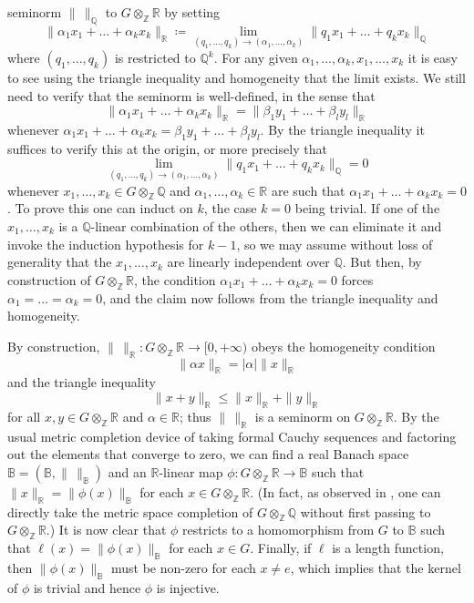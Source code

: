 \documentclass[11pt,a4paper,reqno]{amsart}
\numberwithin{equation}{section}
\theoremstyle{plain}
\theoremstyle{definition}
\newcommand\R{\mathbb{R}}
\newcommand\Z{\mathbb{Z}}
\newcommand\Q{\mathbb{Q}}
\newcommand\normsymb{\ell}  %
\newcommand\norm[1]{\ell({#1})}   %
\begin{document}
seminorm $\|\,\|_\Q$ to $G \otimes_\Z \R$ by setting
\[
\|\alpha_1 x_1 + \dots + \alpha_k x_k\|_\R \coloneqq
\lim_{(q_1,\dots,q_k) \to (\alpha_1,\dots,\alpha_k)} \| q_1 x_1 + \dots +
q_k x_k\|_\Q
\]
where $(q_1,\dots,q_k)$ is restricted to $\Q^k$.  For any given
$\alpha_1,\dots,\alpha_k,x_1,\dots,x_k$ it is easy to see using the
triangle inequality and homogeneity that the limit exists.  We still need
to verify that the seminorm is well-defined, in the sense that
\[
\|\alpha_1 x_1 + \dots + \alpha_k x_k\|_\R  = \| \beta_1 y_1 + \dots +
\beta_l y_l \|_\R
\]
whenever $\alpha_1 x_1 + \dots + \alpha_k x_k = \beta_1 y_1 + \dots +
\beta_l y_l$.  By the triangle inequality it suffices to verify this at
the origin, or more precisely that
\[
\lim_{(q_1,\dots,q_k) \to (\alpha_1,\dots,\alpha_k)} \| q_1 x_1 + \dots +
q_k x_k\|_\Q = 0
\]
whenever $x_1,\dots,x_k \in G \otimes_\Z \Q$ and $\alpha_1,\dots,\alpha_k
\in \R$ are such that $\alpha_1 x_1 + \dots + \alpha_k x_k = 0$.  To
prove this one can induct on $k$, the case $k=0$ being trivial.  If one
of the $x_1,\dots,x_k$ is a $\Q$-linear combination of the others, then
we can eliminate it and invoke the induction hypothesis for $k-1$, so we
may assume without loss of generality that the $x_1,\dots,x_k$ are
linearly independent over $\Q$.  But then, by construction of $G
\otimes_\Z \R$, the condition $\alpha_1 x_1 + \dots + \alpha_k x_k = 0$
forces $\alpha_1=\dots=\alpha_k=0$, and the claim now follows from the
triangle inequality and homogeneity.

By construction, $\| \, \|_\R: G \otimes_\Z \R \to
[0,+\infty)$ obeys the homogeneity condition
\[
\| \alpha x \|_\R = |\alpha| \|x\|_\R
\]
and the triangle inequality
\[
\|x+y\|_\R \leq \|x\|_\R + \|y\|_\R
\]
for all $x,y \in G \otimes_\Z \R$ and $\alpha \in \R$; thus $\|\,\|_\R$
is a seminorm on $G \otimes_\Z \R$.   By the usual metric completion
device of taking formal Cauchy sequences and factoring out the elements
that converge to zero, we can find a real Banach space $\mathbb{B} =
(\mathbb{B},\|\,\|_{\mathbb{B}})$ and an $\R$-linear map $\phi: G
\otimes_\Z \R \to \mathbb{B}$ such that $\|x\|_\R = \| \phi(x)
\|_{\mathbb{B}}$ for each $x \in G \otimes_\Z \R$.
(In fact, as observed in \cite{KR2}, one can directly take the metric
space completion of $G \otimes_\Z \Q$ without first passing to $G
\otimes_\Z \R$.)
It is now clear that $\phi$ restricts to a homomorphism from $G$ to
$\mathbb{B}$ such that $\norm{x} = \| \phi(x) \|_{\mathbb{B}}$ for each
$x \in G$.  Finally, if $\normsymb$ is a length function, then $\|
\phi(x) \|_{\mathbb{B}}$ must be non-zero for each $x \neq e$, which
implies that the kernel of $\phi$ is trivial and hence $\phi$ is
injective.
\end{document}

